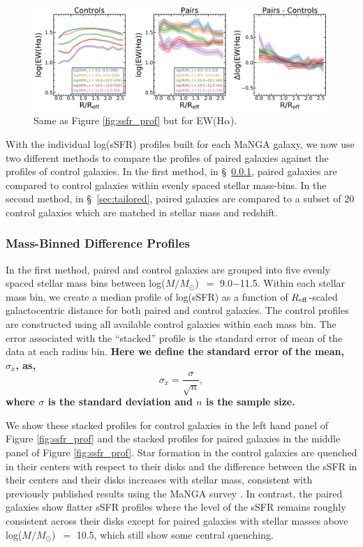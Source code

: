 \documentclass[iop,revtex4,twocolumn,apj,numberedappendix,appendixfloats]{emulateapj}
\newcommand{\reff}{$R_{\rm eff}$}
\newcommand{\logm}{log($M/M_{\odot}$)}
\begin{document}
\begin{figure}
\centering
\includegraphics[width=\linewidth]{fig/ewha_comb.pdf}
\caption[]{Same as Figure \ref{fig:ssfr_prof} but for EW(H$\alpha$). }
\label{fig:ewha_prof}
\end{figure}

With the individual log(sSFR) profiles built for each MaNGA galaxy, we now use two different methods to compare the profiles of paired galaxies against the profiles of control galaxies. In the first method, in \S~\ref{sec:mass-bin}, paired galaxies are compared to control galaxies within evenly spaced stellar mass-bins. In the second method, in \S~\ref{sec:tailored}, paired galaxies are compared to a subset of 20 control galaxies which are matched in stellar mass and redshift. 

\subsubsection{Mass-Binned Difference Profiles}\label{sec:mass-bin}

In the first method, paired and control galaxies are grouped into five evenly spaced stellar mass bins between \logm\ $=$ 9.0$-$11.5. Within each stellar mass bin, we create a median profile of log(sSFR) as a function of \reff-scaled galactocentric distance for both paired and control galaxies. The control profiles are constructed using all available control galaxies within each mass bin. The error associated with the ``stacked'' profile is the standard error of mean of the data at each radius bin. \textbf{Here we define the standard error of the mean, $\sigma_{\overline{x}}$, as,
\begin{equation}
\sigma_{\overline{x}} = \frac{\sigma}{\sqrt{n}},
\end{equation}
where $\sigma$ is the standard deviation and $n$ is the sample size.}

We show these stacked profiles for control galaxies in the left hand panel of Figure \ref{fig:ssfr_prof} and the stacked profiles for paired galaxies in the middle panel of Figure \ref{fig:ssfr_prof}. Star formation in the control galaxies are quenched in their centers with respect to their disks and the difference between the sSFR in their centers and their disks increases with stellar mass, consistent with previously published results using the MaNGA survey \citep{Belfiore:2018}. In contrast, the paired galaxies show flatter sSFR profiles where the level of the sSFR remains roughly consistent across their disks except for paired galaxies with stellar masses above \logm\ $=$ 10.5, which still show some central quenching. 
\end{document}
